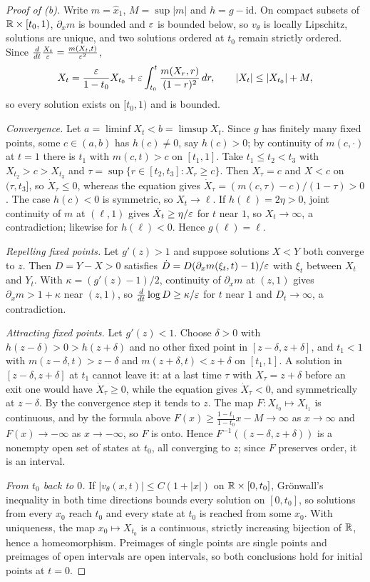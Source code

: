 \documentclass{article} %
\theoremstyle{plain}
\theoremstyle{definition}
\theoremstyle{remark}
\begin{document}
\begin{proof}[Proof of (b)]
Write $m=\hat x_1$, $M=\sup|m|$ and $h=g-\mathrm{id}$. On compact subsets of $\mathbb{R}\times[t_0,1)$,
$\partial_xm$ is bounded and $\varepsilon$ is bounded below, so $v_\theta$ is locally Lipschitz, solutions
are unique, and two solutions ordered at $t_0$ remain strictly ordered. Since
$\frac{d}{dt}\frac{X_t}{\varepsilon}=\frac{m(X_t,t)}{\varepsilon^2}$,
\[
X_t=\frac{\varepsilon}{1-t_0}X_{t_0}+\varepsilon\int_{t_0}^t\frac{m(X_r,r)}{(1-r)^2}\,dr,
\qquad |X_t|\le|X_{t_0}|+M,
\]
so every solution exists on $[t_0,1)$ and is bounded.

\emph{Convergence.} Let $a=\liminf X_t<b=\limsup X_t$. Since $g$ has finitely many fixed points,
some $c\in(a,b)$ has $h(c)\ne0$, say $h(c)>0$; by continuity of $m(c,\cdot)$ at $t=1$ there is $t_1$
with $m(c,t)>c$ on $[t_1,1]$. Take $t_1\le t_2<t_3$ with $X_{t_2}>c>X_{t_3}$ and
$\tau=\sup\{r\in[t_2,t_3]:X_r\ge c\}$. Then $X_\tau=c$ and $X<c$ on $(\tau,t_3]$, so
$\dot X_\tau\le0$, whereas the equation gives $\dot X_\tau=(m(c,\tau)-c)/(1-\tau)>0$. The case
$h(c)<0$ is symmetric, so $X_t\to\ell$. If $h(\ell)=2\eta>0$, joint continuity of $m$ at $(\ell,1)$
gives $\dot X_t\ge\eta/\varepsilon$ for $t$ near $1$, so $X_t\to\infty$, a contradiction; likewise for
$h(\ell)<0$. Hence $g(\ell)=\ell$.

\emph{Repelling fixed points.} Let $g'(z)>1$ and suppose solutions $X<Y$ both converge to $z$. Then
$D=Y-X>0$ satisfies $\dot D=D(\partial_xm(\xi_t,t)-1)/\varepsilon$ with $\xi_t$ between $X_t$ and $Y_t$.
With $\kappa=(g'(z)-1)/2$, continuity of $\partial_xm$ at $(z,1)$ gives $\partial_xm>1+\kappa$
near $(z,1)$, so $\frac{d}{dt}\log D\ge\kappa/\varepsilon$ for $t$ near $1$ and $D_t\to\infty$, a
contradiction.

\emph{Attracting fixed points.} Let $g'(z)<1$. Choose $\delta>0$ with $h(z-\delta)>0>h(z+\delta)$
and no other fixed point in $[z-\delta,z+\delta]$, and $t_1<1$ with $m(z-\delta,t)>z-\delta$ and
$m(z+\delta,t)<z+\delta$ on $[t_1,1]$. A solution in $[z-\delta,z+\delta]$ at $t_1$ cannot leave it:
at a last time $\tau$ with $X_\tau=z+\delta$ before an exit one would have $\dot X_\tau\ge0$, while
the equation gives $\dot X_\tau<0$, and symmetrically at $z-\delta$. By the convergence step it
tends to $z$. The map $F:X_{t_0}\mapsto X_{t_1}$ is continuous, and by the formula above
$F(x)\ge\frac{1-t_1}{1-t_0}x-M\to\infty$ as $x\to\infty$ and $F(x)\to-\infty$ as $x\to-\infty$, so
$F$ is onto. Hence $F^{-1}((z-\delta,z+\delta))$ is a nonempty open set of states at $t_0$, all
converging to $z$; since $F$ preserves order, it is an interval.

\emph{From $t_0$ back to $0$.} If $|v_\theta(x,t)|\le C(1+|x|)$ on $\mathbb{R}\times[0,t_0]$, Gr\"onwall's
inequality in both time directions bounds every solution on $[0,t_0]$, so solutions from every
$x_0$ reach $t_0$ and every state at $t_0$ is reached from some $x_0$. With uniqueness, the map
$x_0\mapsto X_{t_0}$ is a continuous, strictly increasing bijection of $\mathbb{R}$, hence a homeomorphism.
Preimages of single points are single points and preimages of open intervals are open intervals,
so both conclusions hold for initial points at $t=0$.
\end{proof}
\end{document}
